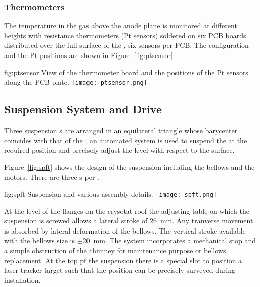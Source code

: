 \subsubsection{Thermometers}

The temperature in the gas above the anode plane is monitored at different heights with resistance thermometers (Pt sensors) soldered on  six PCB boards distributed over the full surface of the , six 
sensors per PCB. The configuration and the Pt positions are shown in Figure~\ref{fig:ptsensor}.

\begin{dunefigure}{fig:ptsensor}
{View of the thermometer board and the positions of the Pt sensors along the PCB plate.}
\texttt{[image: ptsensor.png]}
\end{dunefigure}

\subsection{Suspension System and Drive}
\label{sec:fddp-crp-suspension}

Three suspension \fdth{}s are arranged in an equilateral triangle whose barycenter coincides with that of the ; an automated system is used to suspend the  at the required position and precisely adjust the  level with respect to the \lar surface.

Figure~\ref{fig:spft} shows the design of the suspension \fdth including the bellows and the motors. There are three \fdth{}s per .

\begin{dunefigure}{fig:spft}
{Suspension \fdth and various assembly details.}
\texttt{[image: spft.png]}
\end{dunefigure}

At the level of the flanges on the crysotat roof the adjusting table on which the suspension \fdth is screwed allows a lateral stroke of \SI{26}{mm}. Any tranverse movement is absorbed by lateral deformation of the bellows.
The vertical stroke available with the bellows size is $\pm$\SI{20}{mm}.
The system incorporates a  mechanical stop and a simple obstruction of the chimney for maintenance purpose or bellows replacement.
At the top pf the suspension \fdth there is a special slot to position a laser tracker target
such that the \fdth position can be precisely surveyed during installation.

